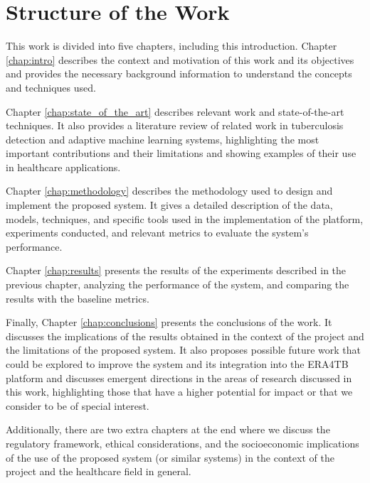 \documentclass[../main.tex]{subfiles}
\begin{document}


    \section{Structure of the Work} \label{sec:structure_of_the_work}

    This work is divided into five chapters, including this introduction. Chapter \ref{chap:intro} describes the context and motivation of this work and its objectives and provides the necessary background information to understand the concepts and techniques used. 
    
    Chapter \ref{chap:state_of_the_art} describes relevant work and state-of-the-art techniques. It also provides a literature review of related work in tuberculosis detection and adaptive machine learning systems, highlighting the most important contributions and their limitations and showing examples of their use in healthcare applications.

    Chapter \ref{chap:methodology} describes the methodology used to design and implement the proposed system.  It gives a detailed description of the data, models, techniques, and specific tools used in the implementation of the platform, experiments conducted, and relevant metrics to evaluate the system's performance.
    
    Chapter \ref{chap:results} presents the results of the experiments described in the previous chapter, analyzing the performance of the system, and comparing the results with the baseline metrics.
    
    Finally, Chapter \ref{chap:conclusions} presents the conclusions of the work. It discusses the implications of the results obtained in the context of the project and the limitations of the proposed system. It also proposes possible future work that could be explored to improve the system and its integration into the ERA4TB platform and discusses emergent directions in the areas of research discussed in this work, highlighting those that have a higher potential for impact or that we consider to be of special interest.

    Additionally, there are two extra chapters at the end where we discuss the regulatory framework, ethical considerations, and the socioeconomic implications of the use of the proposed system (or similar systems) in the context of the project and the healthcare field in general.
    

\end{document}
